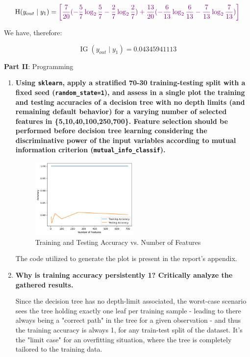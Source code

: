 \documentclass[12pt]{article}
\begin{document}
\begin{enumerate}[leftmargin=\labelsep]
\begin{equation}
  \operatorname{H}(y_{out} \mid y_1) = \textcolor{violet}{\left[\frac{7}{20}(- {\frac{5}{7}} \log_2 \frac{5}{7} - \frac{2}{7} \log_2 \frac{2}{7}) + \frac{13}{20}(- \frac{6}{13} \log_2 \frac{6}{13} - \frac{7}{13} \log_2 \frac{7}{13})\right]}
\end{equation}

We have, therefore:

$$
\operatorname{IG}(y_{out} \mid y_1) = 0.04345941113
$$

\end{enumerate}

\center\large{\textbf{Part II}: Programming}

\begin{enumerate}[leftmargin=\labelsep,resume]
\item \textbf{Using \texttt{sklearn}, apply a stratified 70-30 training-testing split with a fixed seed (\texttt{random\_state=1}), and assess in a single plot the training and testing accuracies of a decision tree with no depth limits (and remaining default behavior) for a varying number of selected features in \{5,10,40,100,250,700\}. Feature selection should be performed before decision tree learning considering the discriminative power of the input variables according to mutual information criterion (\texttt{mutual\_info\_classif}).}

\begin{figure}[htpb]
  \centering
  \includegraphics[width=0.5\textwidth]{../assets/hw1-2.1.png}
  \caption{Training and Testing Accuracy vs. Number of Features}
\end{figure}

The code utilized to generate the plot is present in the report's appendix.

\item \textbf{Why is training accuracy persistently 1? Critically analyze the gathered results.}

Since the decision tree has no depth-limit associated, the worst-case scenario sees the tree
holding exactly one leaf per training sample - leading to there always being a "correct path" in the tree for a given observation - and thus the training accuracy is always 1, for any train-test split of the dataset.
It's the "limit case" for an overfitting situation, where the tree is completely tailored to the training data.


\end{enumerate}
\end{document}

